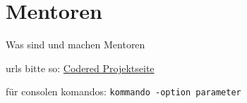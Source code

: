 \chapter{Mentoren}  %
\label{chapter:Mentoren}  %

Was sind und machen Mentoren

urls bitte so:
\href{http://codered.berlios.de}{Codered Projektseite}


für consolen komandos:
\verb|kommando -option parameter|
